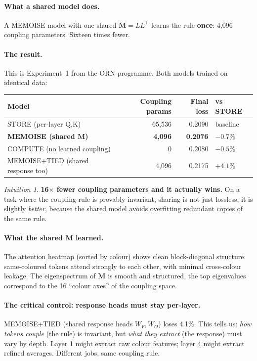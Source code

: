 \documentclass[11pt, a4paper]{article}
\newcommand{\M}{\mathbf{M}}
\theoremstyle{remark}
\newtheorem*{intuition}{Intuition}
\begin{document}
\paragraph{What a shared model does.}
A MEMOISE model with one shared $\M = LL^\top$ learns the rule \textbf{once}: 4,096 coupling parameters.
Sixteen times fewer.

\paragraph{The result.}
This is Experiment~1 from the ORN programme. Both models trained on identical data:

\begin{center}\small
\renewcommand{\arraystretch}{1.3}
\begin{tabular}{@{}lrrl@{}}
\toprule
\textbf{Model} & \textbf{Coupling params} & \textbf{Final loss} & \textbf{vs STORE} \\
\midrule
STORE (per-layer Q,K) & 65,536 & 0.2090 & baseline \\
\textbf{MEMOISE (shared $\M$)} & \textbf{4,096} & \textbf{0.2076} & $\mathbf{-0.7\%}$ \\
COMPUTE (no learned coupling) & 0 & 0.2080 & $-0.5\%$ \\
MEMOISE+TIED (shared response too) & 4,096 & 0.2175 & $+4.1\%$ \\
\bottomrule
\end{tabular}
\end{center}

\begin{intuition}
\textbf{16$\times$ fewer coupling parameters and it actually wins.}
On a task where the coupling rule is provably invariant, sharing is not just lossless, it is slightly \emph{better}, because the shared model avoids overfitting redundant copies of the same rule.
\end{intuition}

\paragraph{What the shared $\M$ learned.}
The attention heatmap (sorted by colour) shows clean block-diagonal structure: same-coloured tokens attend strongly to each other, with minimal cross-colour leakage.
The eigenspectrum of $\M$ is smooth and structured, the top eigenvalues correspond to the 16 ``colour axes'' of the coupling space.

\paragraph{The critical control: response heads must stay per-layer.}
MEMOISE+TIED (shared response heads $W_V, W_O$) loses 4.1\%.
This tells us: \emph{how tokens couple} (the rule) is invariant, but \emph{what they extract} (the response) must vary by depth.
Layer 1 might extract raw colour features; layer 4 might extract refined averages.
Different jobs, same coupling rule.
\end{document}
